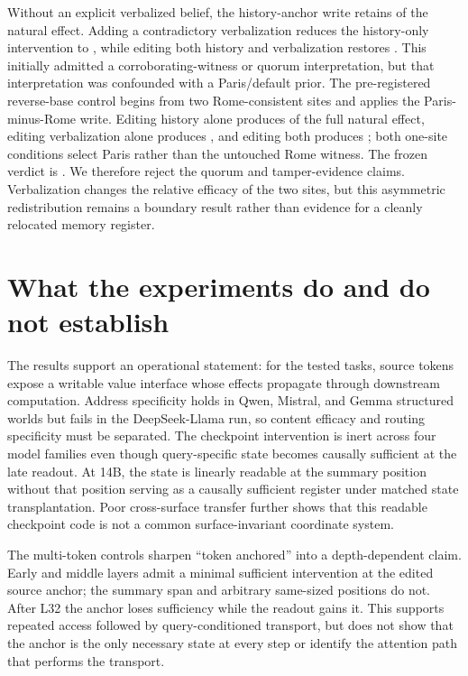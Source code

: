 \documentclass[10pt]{article}
\begin{document}
Without an explicit verbalized belief, the history-anchor write retains
\PilotVerbalHistoryNoV{} of the natural effect. Adding a contradictory
verbalization reduces the history-only intervention to
\PilotVerbalHistoryV{}, while editing both history and verbalization restores
\PilotVerbalBoth{}. This initially admitted a corroborating-witness or quorum
interpretation, but that interpretation was confounded with a Paris/default
prior. The pre-registered reverse-base control begins from two Rome-consistent
sites and applies the Paris-minus-Rome write. Editing history alone produces
\ConfirmReverseHistory{} of the full natural effect, editing verbalization
alone produces \ConfirmReverseVerbal{}, and editing both produces
\ConfirmReverseBoth{}; both one-site conditions select Paris rather than the
untouched Rome witness. The frozen verdict is
\texttt{\ConfirmReverseVerdict}. We therefore reject the quorum and
tamper-evidence claims. Verbalization changes the relative efficacy of the two
sites, but this asymmetric redistribution remains a boundary result rather
than evidence for a cleanly relocated memory register.

\section{What the experiments do and do not establish}

The results support an operational statement: for the tested tasks, source
tokens expose a writable value interface whose effects propagate through
downstream computation. Address specificity holds in Qwen, Mistral, and Gemma
structured worlds but fails in the DeepSeek-Llama run, so content efficacy and
routing specificity must be separated. The checkpoint intervention is inert
across four model families even though query-specific state becomes causally
sufficient at the late readout. At 14B, the state is linearly readable at the
summary position without that position serving as a causally sufficient
register under matched state transplantation. Poor cross-surface transfer
further shows that this readable checkpoint code is not a common
surface-invariant coordinate system.

The multi-token controls sharpen ``token anchored'' into a depth-dependent
claim. Early and middle layers admit a minimal sufficient intervention at the
edited source anchor; the summary span and arbitrary same-sized positions do
not. After L32 the anchor loses sufficiency while the readout gains it. This
supports repeated access followed by query-conditioned transport, but does not
show that the anchor is the only necessary state at every step or identify the
attention path that performs the transport.
\end{document}
